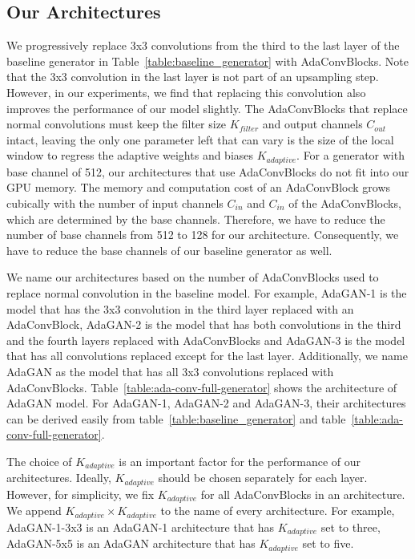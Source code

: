 \documentclass{article} %
\begin{document}
\subsection{Our Architectures}
\label{our_architectures}
We progressively replace 3x3 convolutions from the third to the last layer of the baseline generator in Table~\ref{table:baseline_generator} with AdaConvBlocks. Note that the 3x3 convolution in the last layer is not part of an upsampling step. However, in our experiments, we find that replacing this convolution also improves the performance of our model slightly. The AdaConvBlocks that replace normal convolutions must keep the filter size $K_{filter}$ and output channels $C_{out}$ intact, leaving the only one parameter left that can vary is the size of the local window to regress the adaptive weights and biases $K_{adaptive}$. For a generator with base channel of 512, our architectures that use AdaConvBlocks do not fit into our GPU memory. The memory and computation cost of an AdaConvBlock grows cubically with the number of input channels $C_{in}$ and $C_{in}$ of the AdaConvBlocks, which are determined by the base channels. Therefore, we have to reduce the number of base channels from 512 to 128 for our architecture. Consequently, we have to reduce the base channels of our baseline generator as well. \par
We name our architectures based on the number of AdaConvBlocks used to replace normal convolution in the baseline model. For example, AdaGAN-1 is the model that has the 3x3 convolution in the third layer replaced with an AdaConvBlock, AdaGAN-2 is the model that has both convolutions in the third and the fourth layers replaced with AdaConvBlocks and AdaGAN-3 is the model that has all convolutions replaced except for the last layer. Additionally, we name AdaGAN as the model that has all 3x3 convolutions replaced with AdaConvBlocks. Table~\ref{table:ada-conv-full-generator} shows the architecture of AdaGAN model. For AdaGAN-1, AdaGAN-2 and AdaGAN-3, their architectures can be derived easily from table~\ref{table:baseline_generator} and table~\ref{table:ada-conv-full-generator}. \par
The choice of $K_{adaptive}$ is an important factor for the performance of our architectures. Ideally, $K_{adaptive}$ should be chosen separately for each layer. However, for simplicity, we fix $K_{adaptive}$ for all AdaConvBlocks in an architecture. We append $K_{adaptive} \times K_{adaptive}$ to the name of every architecture. For example, AdaGAN-1-3x3 is an AdaGAN-1 architecture that has $K_{adaptive}$ set to three, AdaGAN-5x5 is an AdaGAN architecture that has $K_{adaptive}$ set to five.
\end{document}
